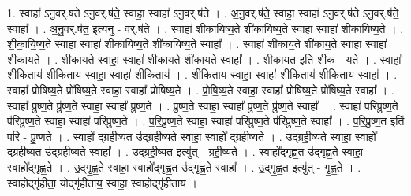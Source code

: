 \documentclass[17pt]{extarticle}
\begin{document}
1. स्वाहा॑ ऽनु॒वर्.ष॑ते ऽनु॒वर्.ष॑ते॒ स्वाहा॒ स्वाहा॑ ऽनु॒वर्.ष॑ते । . अ॒नु॒वर्.ष॑ते॒ स्वाहा॒ स्वाहा॑ ऽनु॒वर्.ष॑ते ऽनु॒वर्.ष॑ते॒ स्वाहा᳚ । . अ॒नु॒वर्.ष॑त॒ इत्य॑नु - वर्.ष॑ते । . स्वाहा॑ शीकायिष्य॒ते शी॑कायिष्य॒ते स्वाहा॒ स्वाहा॑ शीकायिष्य॒ते । . शी॒का॒यि॒ष्य॒ते स्वाहा॒ स्वाहा॑ शीकायिष्य॒ते शी॑कायिष्य॒ते स्वाहा᳚ । . स्वाहा॑ शीकाय॒ते शी॑काय॒ते स्वाहा॒ स्वाहा॑ शीकाय॒ते । . शी॒का॒य॒ते स्वाहा॒ स्वाहा॑ शीकाय॒ते शी॑काय॒ते स्वाहा᳚ । . शी॒का॒य॒त इति॑ शीक - य॒ते । . स्वाहा॑ शीकि॒ताय॑ शीकि॒ताय॒ स्वाहा॒ स्वाहा॑ शीकि॒ताय॑ । . शी॒कि॒ताय॒ स्वाहा॒ स्वाहा॑ शीकि॒ताय॑ शीकि॒ताय॒ स्वाहा᳚ । . स्वाहा᳚ प्रोषिष्य॒ते प्रो॑षिष्य॒ते स्वाहा॒ स्वाहा᳚ प्रोषिष्य॒ते । . प्रो॒षि॒ष्य॒ते स्वाहा॒ स्वाहा᳚ प्रोषिष्य॒ते प्रो॑षिष्य॒ते स्वाहा᳚ । . स्वाहा᳚ प्रुष्ण॒ते प्रु॑ष्ण॒ते स्वाहा॒ स्वाहा᳚ प्रुष्ण॒ते । . प्रु॒ष्ण॒ते स्वाहा॒ स्वाहा᳚ प्रुष्ण॒ते प्रु॑ष्ण॒ते स्वाहा᳚ । . स्वाहा॑ परिप्रुष्ण॒ते प॑रिप्रुष्ण॒ते स्वाहा॒ स्वाहा॑ परिप्रुष्ण॒ते । . प॒रि॒प्रु॒ष्ण॒ते स्वाहा॒ स्वाहा॑ परिप्रुष्ण॒ते प॑रिप्रुष्ण॒ते स्वाहा᳚ । . प॒रि॒प्रु॒ष्ण॒त इति॑ परि - प्रु॒ष्ण॒ते । . स्वाहो᳚ द्‍ग्रहीष्य॒त उ॑द्‍ग्रहीष्य॒ते स्वाहा॒ स्वाहो᳚ द्‍ग्रहीष्य॒ते । . उ॒द्‍ग्र॒ही॒ष्य॒ते स्वाहा॒ स्वाहो᳚ द्‍ग्रहीष्य॒त उ॑द्‍ग्रहीष्य॒ते स्वाहा᳚ । . उ॒द्‍ग्र॒ही॒ष्य॒त इत्यु॑त् - ग्र॒ही॒ष्य॒ते । . स्वाहो᳚द्‍गृह्ण॒त उ॑द्‍गृह्ण॒ते स्वाहा॒ स्वाहो᳚द्‍गृह्ण॒ते । . उ॒द्‍गृ॒ह्ण॒ते स्वाहा॒ स्वाहो᳚द्‍गृह्ण॒त उ॑द्‍गृह्ण॒ते स्वाहा᳚ । . उ॒द्‍गृ॒ह्ण॒त इत्यु॑त् - गृ॒ह्ण॒ते । . स्वाहोद्‍गृ॑हीता॒ योद्‍गृ॑हीताय॒ स्वाहा॒ स्वाहोद्‍गृ॑हीताय । \newline
\end{document}
